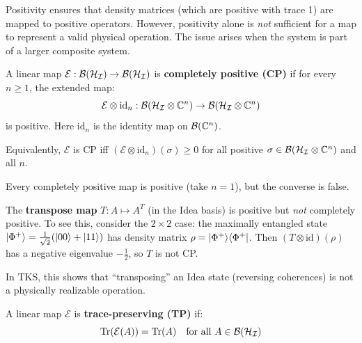 \begin{remark}
\label{rem:positivity-not-sufficient}
Positivity ensures that density matrices (which are positive with trace 1) are mapped to positive operators. However, positivity alone is \emph{not} sufficient for a map to represent a valid physical operation. The issue arises when the system is part of a larger composite system.
\end{remark}

\begin{definition}
\label{def:cp-map}
A linear map $\mathcal{E} : \mathcal{B}(\mathcal{H}_{\mathcal{I}}) \to \mathcal{B}(\mathcal{H}_{\mathcal{I}})$ is \textbf{completely positive (CP)} if for every $n \geq 1$, the extended map:
\[
\mathcal{E} \otimes \mathrm{id}_n : \mathcal{B}(\mathcal{H}_{\mathcal{I}} \otimes \mathbb{C}^n) \to \mathcal{B}(\mathcal{H}_{\mathcal{I}} \otimes \mathbb{C}^n)
\]
is positive. Here $\mathrm{id}_n$ is the identity map on $\mathcal{B}(\mathbb{C}^n)$.

Equivalently, $\mathcal{E}$ is CP iff $(\mathcal{E} \otimes \mathrm{id}_n)(\sigma) \geq 0$ for all positive $\sigma \in \mathcal{B}(\mathcal{H}_{\mathcal{I}} \otimes \mathbb{C}^n)$ and all $n$.
\end{definition}

\begin{proposition}
\label{prop:cp-implies-positive}
Every completely positive map is positive (take $n = 1$), but the converse is false.
\end{proposition}

\begin{example}
\label{ex:transpose-not-cp}
The \textbf{transpose map} $T : A \mapsto A^T$ (in the Idea basis) is positive but \emph{not} completely positive. To see this, consider the $2 \times 2$ case: the maximally entangled state $|\Phi^+\rangle = \frac{1}{\sqrt{2}}(|00\rangle + |11\rangle)$ has density matrix $\rho = |\Phi^+\rangle\langle \Phi^+|$. Then $(T \otimes \mathrm{id})(\rho)$ has a negative eigenvalue $-\frac{1}{2}$, so $T$ is not CP.

In TKS, this shows that ``transposing'' an Idea state (reversing coherences) is not a physically realizable operation.
\end{example}

\begin{definition}
\label{def:trace-preserving}
A linear map $\mathcal{E}$ is \textbf{trace-preserving (TP)} if:
\[
\mathrm{Tr}(\mathcal{E}(A)) = \mathrm{Tr}(A) \quad \text{for all } A \in \mathcal{B}(\mathcal{H}_{\mathcal{I}})
\]
\end{definition}


